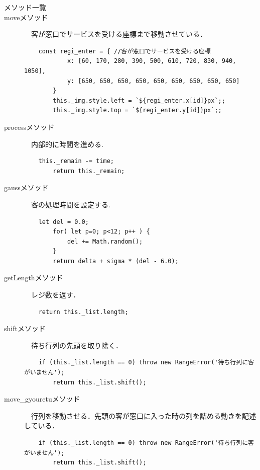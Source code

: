 \documentclass[12pt,a4j]{ltjsarticle}
\begin{document}
\begin{description}
\item[メソッド一覧]
\item[moveメソッド]　客が窓口でサービスを受ける座標まで移動させている．
\begin{lstlisting}
	const regi_enter = { //客が窓口でサービスを受ける座標
            x: [60, 170, 280, 390, 500, 610, 720, 830, 940, 1050],
            y: [650, 650, 650, 650, 650, 650, 650, 650, 650]
        }
        this._img.style.left = `${regi_enter.x[id]}px`;;
        this._img.style.top = `${regi_enter.y[id]}px`;;
\end{lstlisting}   
  \vspace{10mm}

\item[processメソッド]　内部的に時間を進める.
\begin{lstlisting}
	this._remain -= time;
        return this._remain;
\end{lstlisting} 
  \vspace{10mm}

\item[gaussメソッド]　客の処理時間を設定する.
\begin{lstlisting}
	let del = 0.0;
        for( let p=0; p<12; p++ ) {
            del += Math.random();
        }
        return delta + sigma * (del - 6.0);
\end{lstlisting}   
\vspace{10mm}

\item[getLengthメソッド]　レジ数を返す．
\begin{lstlisting}
	return this._list.length;
\end{lstlisting}   
\vspace{10mm}

\item[shiftメソッド]　待ち行列の先頭を取り除く．
\begin{lstlisting}
	if (this._list.length == 0) throw new RangeError('待ち行列に客がいません');
        return this._list.shift();\end{lstlisting}   
\vspace{10mm}

\item[move\_gyouretuメソッド]　行列を移動させる．先頭の客が窓口に入った時の列を詰める動きを記述している．
\begin{lstlisting}
	if (this._list.length == 0) throw new RangeError('待ち行列に客がいません');
        return this._list.shift();
\end{lstlisting}   
\vspace{10mm}
\clearpage


\end{description}
\end{document}

